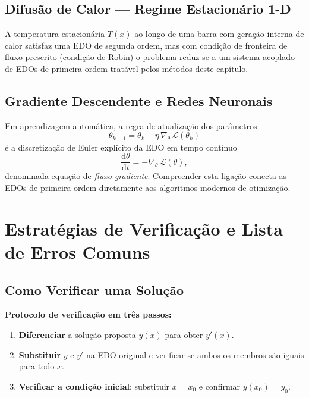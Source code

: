 \documentclass[12pt, a4paper]{article}
\newcommand{\dd}{\mathrm{d}}
\begin{document}
\subsection{Difusão de Calor --- Regime Estacionário 1-D}

A temperatura estacionária $T(x)$ ao longo de uma barra com geração interna de calor
satisfaz uma EDO de segunda ordem, mas com condição de fronteira de fluxo prescrito
(condição de Robin) o problema reduz-se a um sistema acoplado de EDOs de primeira ordem
tratável pelos métodos deste capítulo.

\subsection{Gradiente Descendente e Redes Neuronais}

Em aprendizagem automática, a regra de atualização dos parâmetros
\[
  \theta_{k+1} = \theta_k - \eta\,\nabla_{\!\theta}\,\mathcal{L}(\theta_k)
\]
é a discretização de Euler explícito da EDO em tempo contínuo
\[
  \frac{\dd\theta}{\dd t} = -\nabla_{\!\theta}\,\mathcal{L}(\theta),
\]
denominada equação de \emph{fluxo gradiente}. Compreender esta ligação conecta as EDOs de
primeira ordem diretamente aos algoritmos modernos de otimização.

\section{Estratégias de Verificação e Lista de Erros Comuns}
\label{sec:verification}

\subsection{Como Verificar uma Solução}

\begin{tipbox}
  \textbf{Protocolo de verificação em três passos:}
  \begin{enumerate}
    \item \textbf{Diferenciar} a solução proposta $y(x)$ para obter $y'(x)$.
    \item \textbf{Substituir} $y$ e $y'$ na EDO original e verificar se ambos os membros
          são iguais para todo $x$.
    \item \textbf{Verificar a condição inicial}: substituir $x=x_0$ e confirmar
          $y(x_0)=y_0$.
  \end{enumerate}
\end{tipbox}
\end{document}
